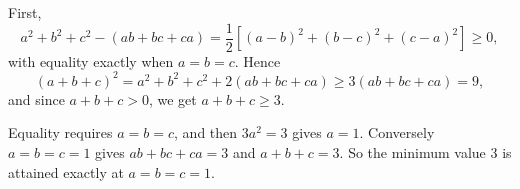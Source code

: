First,
\[a^2+b^2+c^2-(ab+bc+ca)=\dfrac{1}{2}\left[(a-b)^2+(b-c)^2+(c-a)^2\right]\ge0,\]
with equality exactly when $a=b=c$. Hence
\[(a+b+c)^2=a^2+b^2+c^2+2(ab+bc+ca)\ge3(ab+bc+ca)=9,\]
and since $a+b+c>0$, we get $a+b+c\ge3$.

Equality requires $a=b=c$, and then $3a^2=3$ gives $a=1$. Conversely $a=b=c=1$ gives $ab+bc+ca=3$ and $a+b+c=3$. So the minimum value $3$ is attained exactly at $\boxed{a=b=c=1}$.
